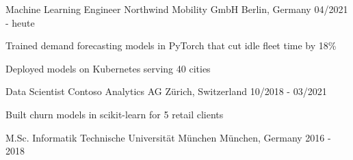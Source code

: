 \documentclass[11pt, a4paper]{awesome-cv}
\begin{document}
\makecvheader
{}
\begin{cventries}
  \cventry
    {Machine Learning Engineer}
    {Northwind Mobility GmbH}
    {Berlin, Germany}
    {04/2021 - heute}
    {
      \begin{cvitems}
        \item {Trained demand forecasting models in PyTorch that cut idle fleet time by 18\%}
        \item {Deployed models on Kubernetes serving 40 cities}
      \end{cvitems}
    }
  \cventry
    {Data Scientist}
    {Contoso Analytics AG}
    {Zürich, Switzerland}
    {10/2018 - 03/2021}
    {
      \begin{cvitems}
        \item {Built churn models in scikit-learn for 5 retail clients}
      \end{cvitems}
    }
\end{cventries}
\begin{cventries}
  \cventry
    {M.Sc. Informatik}
    {Technische Universität München}
    {München, Germany}
    {2016 - 2018}
    {}
\end{cventries}
\begin{cvskills}
\end{cvskills}
\begin{cvskills}
\end{cvskills}
\end{document}
